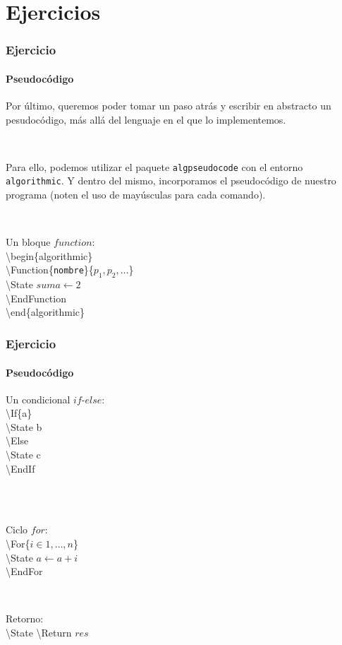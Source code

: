 \section{Ejercicios}\label{ejercicios}

\begin{frame}
\frametitle{Ejercicio}
\framesubtitle{Pseudocódigo}

Por último, queremos poder tomar un paso atrás y escribir en abstracto un pesudocódigo, más allá del lenguaje en el que lo implementemos.

\

Para ello, podemos utilizar el \textcolor{codeorange}{paquete} \texttt{algpseudocode} con el \textcolor{codeorange}{entorno} \texttt{algorithmic}. Y dentro del mismo, incorporamos el pseudocódigo de nuestro programa (noten el uso de mayúsculas para cada comando).

\pause

\


Un bloque $function$: \\

\textbackslash begin\{algorithmic\} \\
\textbackslash Function\{\texttt{nombre}\}\{$p_1, p_2,\ldots$\} \\
\hspace*{15pt} \textbackslash State $suma \gets 2$ \\
\textbackslash EndFunction \\
\textbackslash end\{algorithmic\}

\end{frame}

\begin{frame}
\frametitle{Ejercicio}
\framesubtitle{Pseudocódigo}


\begin{multicols}{2}

Un condicional $if$-$else$: \\

\textbackslash If\{a\} \\
\hspace*{15pt} \textbackslash State b \\
\textbackslash Else \\
\hspace*{15pt} \textbackslash State c \\
\textbackslash EndIf \\

\

\

Ciclo $for$: \\

\textbackslash For\{$i \in 1,\ldots,n$\} \\
\hspace*{15pt} \textbackslash State $a \gets a + i$ \\
\textbackslash EndFor

\

Retorno: \\

\textbackslash State \textbackslash Return $res$ \\


\end{multicols}
\end{frame}


